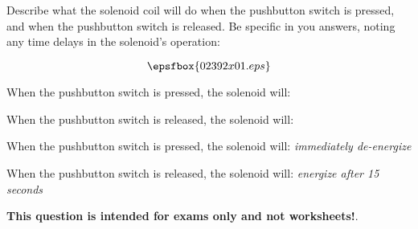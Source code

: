 

Describe what the solenoid coil will do when the pushbutton switch is pressed, and when the pushbutton switch is released.  Be specific in you answers, noting any time delays in the solenoid's operation:

$$\epsfbox{02392x01.eps}$$

When the pushbutton switch is pressed, the solenoid will:

\vskip 20pt

When the pushbutton switch is released, the solenoid will:







When the pushbutton switch is pressed, the solenoid will: {\it immediately de-energize}

\vskip 5pt

When the pushbutton switch is released, the solenoid will: {\it energize after 15 seconds}







{\bf This question is intended for exams only and not worksheets!}.




